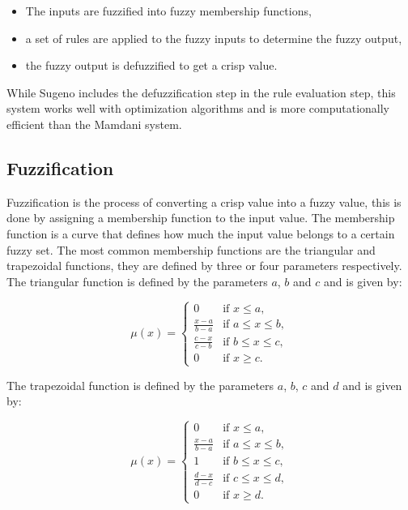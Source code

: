 \begin{itemize}
	\item The inputs are fuzzified into fuzzy membership functions,
	\item a set of rules are applied to the fuzzy inputs to determine the fuzzy output,
	\item the fuzzy output is defuzzified to get a crisp value.
\end{itemize}

While Sugeno includes the defuzzification step in the rule evaluation step, this system works well with optimization
algorithms and is more computationally efficient than the Mamdani system.

\subsection{Fuzzification}
\label{subsec:fuzzy-fuzzification}

Fuzzification is the process of converting a crisp value into a fuzzy value, this is done by assigning a membership
function to the input value. The membership function is a curve that defines how much the input value belongs to a
certain fuzzy set. The most common membership functions are the triangular and trapezoidal functions, they are defined
by three or four parameters respectively. The triangular function is defined by the parameters $a$, $b$ and $c$ and
is given by:

\begin{equation}
	\mu(x) = \begin{cases}
		0                   & \text{if } x \leq a,        \\
		\frac{x - a}{b - a} & \text{if } a \leq x \leq b, \\
		\frac{c - x}{c - b} & \text{if } b \leq x \leq c, \\
		0                   & \text{if } x \geq c.
	\end{cases}
\end{equation}

The trapezoidal function is defined by the parameters $a$, $b$, $c$ and $d$ and is given by:

\begin{equation}
	\mu(x) = \begin{cases}
		0                   & \text{if } x \leq a,        \\
		\frac{x - a}{b - a} & \text{if } a \leq x \leq b, \\
		1                   & \text{if } b \leq x \leq c, \\
		\frac{d - x}{d - c} & \text{if } c \leq x \leq d, \\
		0                   & \text{if } x \geq d.
	\end{cases}
\end{equation}

